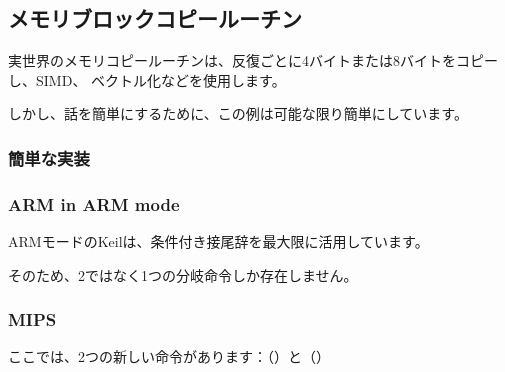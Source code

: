 ﻿\subsection{メモリブロックコピールーチン}
\label{loop_memcpy}

実世界のメモリコピールーチンは、反復ごとに4バイトまたは8バイトをコピーし、\ac{SIMD}、
ベクトル化などを使用します。

しかし、話を簡単にするために、この例は可能な限り簡単にしています。



\subsubsection{簡単な実装}







\subsubsection{ARM in ARM mode}

ARMモードのKeilは、条件付き接尾辞を最大限に活用しています。



そのため、2ではなく1つの分岐命令しか存在しません。

\subsubsection{MIPS}




ここでは、2つの新しい命令があります：（）と（）

